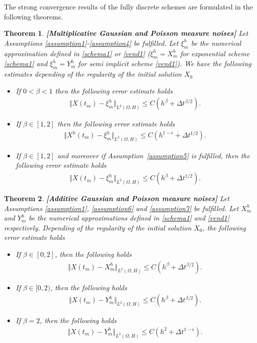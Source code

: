 \documentclass[review,12pt]{elsarticle}
\newtheorem{theorem}{Theorem}[section]
\newcommand{\assref}[1]{{Assumption~\ref{#1}}}
\begin{document}
The strong convergence results of the fully discrete schemes are formulated in the following theorems.
\begin{theorem}\textbf{[Multiplicative Gaussian and Poisson measure noises]}
\label{mainresult1}
Let Assumptions \ref{assumption1}-\ref{assumption4} be fulfilled.  Let $\xi^h_m$ be the numerical approximation defined in \eqref{schema1}  or \eqref{vend1} ($\xi^h_m=X^h_m$ for exponential scheme \eqref{schema1}  and  $\xi^h_m=Y^h_m$ 
for  semi implicit scheme \eqref{vend1}). We have the following estimates depending of the regularity of the initial solution $X_0$
\begin{itemize}
\item[(i)] If $0<\beta<1$ then the following error estimate holds
\begin{eqnarray}
\Vert X(t_m)-\xi^h_m\Vert_{L^2(\Omega, H)}\leq C\left(h^{\beta}+\Delta t^{\beta/2}\right).
\end{eqnarray}
\item[(ii)] If $\beta\in[1, 2]$ then the following error estimate holds
\begin{eqnarray}
\Vert X^h(t_m)-\xi^h_m\Vert_{L^2(\Omega, H)}\leq C\left(h^{1-\epsilon}+\Delta t^{1/2}\right).
\end{eqnarray}
\item[(iii)] If $\beta\in[1, 2]$ and moreover if \assref{assumption5} is fulfilled, then the following error estimate holds
\begin{eqnarray}
\Vert X(t_m)-\xi^h_m\Vert_{L^2(\Omega, H)}\leq C\left(h^{\beta}+\Delta t^{1/2}\right).
\end{eqnarray}
\end{itemize}
\end{theorem}
\begin{theorem}\textbf{[Additive Gaussian and Poisson measure noises]}
\label{mainresult2}
Let Assumptions \ref{assumption1}, \ref{assumption6} and \ref{assumption7} be fulfilled.  Let $X^h_m$ and $Y^h_m$  be the numerical approximations defined in \eqref{schema1}  and \eqref{vend1} respectively.
Depending of the regularity of the initial solution $X_0$, the following error estimate holds
\begin{itemize}
\item [(i)]  If $\beta\in[0, 2]$, then the following holds
\begin{eqnarray}
\Vert X(t_m)-X^h_m\Vert_{L^2(\Omega, H)}\leq C\left(h^{\beta}+\Delta t^{\beta/2}\right).
\end{eqnarray}
\item[(ii)] If $\beta\in[0, 2)$, then the following holds
\begin{eqnarray}
\Vert X(t_m)-Y^h_m\Vert_{L^2(\Omega, H)}\leq C\left(h^{\beta}+\Delta t^{\beta/2}\right).
\end{eqnarray}
\item[(iii)] If $\beta=2$, then the following holds
\begin{eqnarray}
\Vert X(t_m)-Y^h_m\Vert_{L^2(\Omega, H)}\leq C\left(h^2+\Delta t^{1-\epsilon}\right).
\end{eqnarray}
\end{itemize}
\end{theorem}
\end{document}
